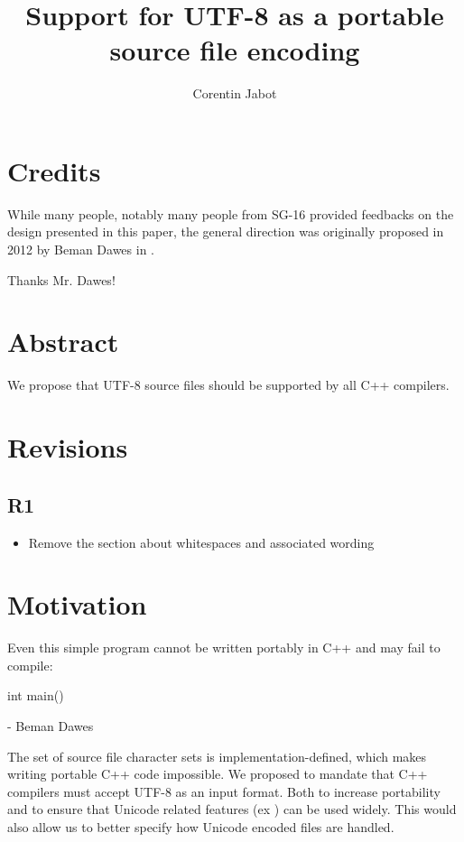 \documentclass{wg21}
\title{Support for UTF-8 as a portable source file encoding}
\author{Corentin Jabot}{corentin.jabot@gmail.com}
\begin{document}
\maketitle


\section{Credits}

While many people, notably many people from SG-16 provided feedbacks on the design presented in this paper,
the general direction was originally proposed in 2012 by Beman Dawes in .

Thanks Mr. Dawes!

\section{Abstract}

We propose that UTF-8 source files should be supported by all C++ compilers.

\section{Revisions}

\subsection{R1}
\begin{itemize}
    \item Remove the section about whitespaces and associated wording
\end{itemize}

\section{Motivation}

\begin{quoteblock}
    Even this simple program cannot be written portably in C++ and may fail to compile:
\begin{codeblock}
    int main() {}
\end{codeblock}
 - Beman Dawes
\end{quoteblock}

The set of source file character sets is implementation-defined, which makes writing portable C++ code impossible.
We proposed to mandate that C++ compilers must accept UTF-8 as an input format. Both to increase portability and
to ensure that Unicode related features (ex ) can be used widely.
This would also allow us to better specify how Unicode encoded files are handled.
\end{document}

